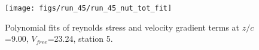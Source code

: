 \begin{figure}[H]
\centering
\texttt{[image: figs/run\_45/run\_45\_nut\_tot\_fit]}
\caption{Polynomial fits of reynolds stress and velocity gradient terms at $z/c$=9.00, $V_{free}$=23.24, station 5.}
\label{fig:run_45_nut_tot_fit}
\end{figure}



